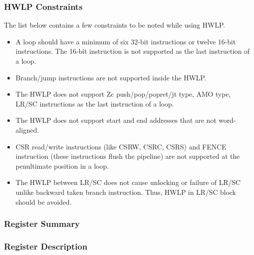 \documentclass[main\_\_EN.tex]{subfiles}
\begin{document}
\subsubsection{HWLP Constraints}
\label{sec:riscvcpu-hwloop-constraints}

The list below contains a few constraints to be noted while using HWLP.


\begin{itemize}
\item A loop should have a minimum of six 32-bit instructions or twelve 16-bit instructions. The 16-bit instruction is not supported as the last instruction of a loop.
\item Branch/jump instructions are not supported inside the HWLP.
\item The HWLP does not support Zc push/pop/popret/jt type, AMO type, LR/SC instructions as the last instruction of a loop.
\item The HWLP does not support start and end addresses that are not word-aligned.
\item CSR read/write instructions (like CSRW, CSRC, CSRS) and FENCE instruction (these instructions flush the pipeline) are not supported at the penultimate position in a loop.
\item The HWLP between LR/SC does not cause unlocking or failure of LR/SC unlike backward taken branch instruction. Thus, HWLP in LR/SC block should be avoided.
\end{itemize}


\subsubsection{Register Summary}
\label{sec:riscvcpu-hwloop-reg-summ}



\subsubsection{Register Description}
\label{sec:riscvcpu-hwloop-reg-desc}

\end{document}
